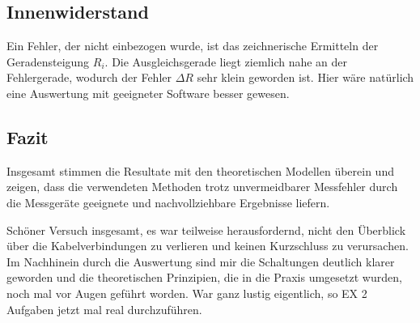 \subsection{Innenwiderstand}
Ein Fehler, der nicht einbezogen wurde, ist das zeichnerische Ermitteln der Geradensteigung \(R_i\). Die Ausgleichsgerade liegt ziemlich nahe an der Fehlergerade, wodurch der Fehler \(\Delta R\) sehr klein geworden ist. Hier wäre natürlich eine Auswertung mit geeigneter Software besser gewesen.

\subsection{Fazit}
Insgesamt stimmen die Resultate mit den theoretischen Modellen überein und zeigen, dass die verwendeten Methoden trotz unvermeidbarer Messfehler durch die Messgeräte geeignete und nachvollziehbare Ergebnisse liefern.

Schöner Versuch insgesamt, es war teilweise herausfordernd, nicht den Überblick über die Kabelverbindungen zu verlieren und keinen Kurzschluss zu verursachen. Im Nachhinein durch die Auswertung sind mir die Schaltungen deutlich klarer geworden und die theoretischen Prinzipien, die in die Praxis umgesetzt wurden, noch mal vor Augen geführt worden. War ganz lustig eigentlich, so EX 2 Aufgaben jetzt mal real durchzuführen.
